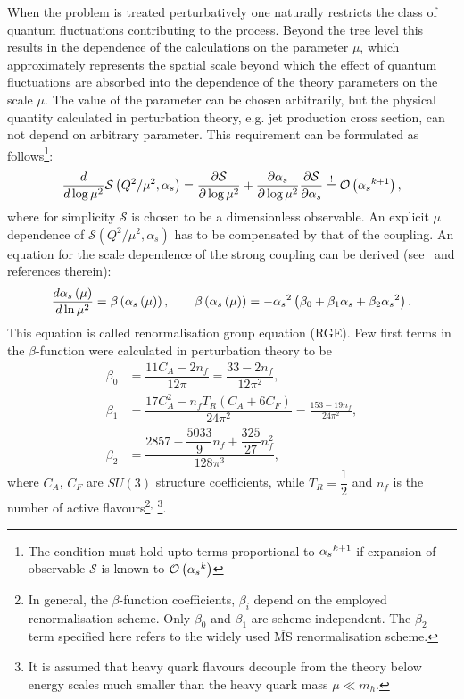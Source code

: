 When the problem is treated perturbatively one naturally restricts the class of quantum fluctuations contributing to the process. Beyond the tree level this results in the dependence of the calculations on the parameter $\mu$, which approximately represents the spatial scale beyond which the effect of quantum fluctuations are absorbed into the dependence of the theory parameters on the scale $\mu$. The value of the parameter can be chosen arbitrarily, but the physical quantity calculated in perturbation theory, e.g. jet production cross section, can not depend on arbitrary parameter. This requirement can be formulated as follows\footnote{The condition must hold upto terms proportional to $\mbox{$\alpha_{s}$}^{k+1}$ if expansion of observable $\mathcal{S}$ is known to $\mathcal{O}\left(\mbox{$\alpha_{s}$}^{k}\right)$}:
\begin{equation}
 \frac{d}{d\log{\mu^2}} \mathcal{S} \left( Q^2/\mu^2, \alpha_s \right) = \frac{\partial \mathcal{S} }{\partial \log{\mu^2}} + \frac{\partial \alpha_s }{\partial \log{\mu^2}}\frac{\partial \mathcal{S} }{\partial \alpha_s} \stackrel{!}{=} \mathcal{O}\left(\mbox{$\alpha_{s}$}^{k+1}\right),
\end{equation}
where for simplicity $\mathcal{S}$ is chosen to be a dimensionless observable. An explicit $\mu$ dependence of $\mathcal{S} \left( Q^2/\mu^2, \alpha_s \right)$ has to be compensated by that of the coupling. An equation for the scale dependence of the strong coupling can be derived (see~\cite{pdg} and references therein):
 \begin{equation}
   \frac{d\mbox{$\alpha_{s}$}\left(\mu\right)}{d\ln{\mu^2}} = \beta\left(\mbox{$\alpha_{s}$}\left(\mu\right)\right),\qquad \beta\left(\mbox{$\alpha_{s}$}\left(\mu\right)\right) = -\mbox{$\alpha_{s}$}^2\left(\beta_0 + \beta_1\mbox{$\alpha_{s}$} + \beta_2\mbox{$\alpha_{s}$}^2\right).
 \label{eq:asrunnig}
 \end{equation}
This equation is called renormalisation group equation (RGE). Few first terms in the $\beta$-function were calculated in perturbation theory to be
\begin{align}
	\beta_0 &= \dfrac{11C_A-2n_f}{12\pi} = \dfrac{33 - 2n_f}{12\pi^2},\\
	\beta_1 &= \dfrac{17C_A^2-n_fT_R\left(C_A+6C_F\right)}{24\pi^2} = \frac{153-19n_f}{24\pi^2},\\
	\beta_2 &= \dfrac{2857-\dfrac{5033}{9}n_f+\dfrac{325}{27}n_f^2}{128\pi^3},
\end{align}
where $C_A$, $C_F$ are $SU\left(3\right)$ structure coefficients, while $T_R=\dfrac{1}{2}$ and $n_f$ is the number of active flavours\footnote{In general, the $\beta$-function coefficients, $\beta_i$ depend on the employed renormalisation scheme. Only $\beta_0$ and $\beta_1$ are scheme independent. The $\beta_2$ term specified here refers to the widely used $\overline{\mathrm{MS}}$ renormalisation scheme.}$^,$
\footnote{It is assumed that heavy quark flavours decouple from the theory below energy scales much smaller than the heavy quark mass $\mu \ll m_h$.}. 

